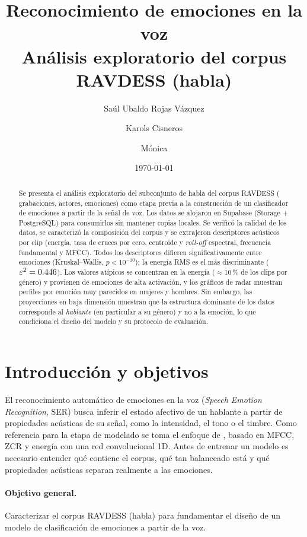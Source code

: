 \documentclass[11pt,a4paper]{article}
\title{\textbf{Reconocimiento de emociones en la voz}\\[4pt]
\large Análisis exploratorio del corpus RAVDESS (habla)}
\author{Saúl Ubaldo Rojas Vázquez \and Karols Cisneros \and Mónica}
\date{\today}
\begin{document}
\maketitle
\thispagestyle{empty}

\begin{abstract}
\noindent Se presenta el análisis exploratorio del subconjunto de habla del corpus RAVDESS
(\nClips{} grabaciones, \nActores{} actores, \nEmociones{} emociones) como etapa previa a la construcción
de un clasificador de emociones a partir de la señal de voz. Los datos se alojaron en Supabase
(Storage + PostgreSQL) para consumirlos sin mantener copias locales. Se verificó la calidad de los
datos, se caracterizó la composición del corpus y se extrajeron \nDescriptores{} descriptores acústicos por
clip (energía, tasa de cruces por cero, centroide y \emph{roll-off} espectral, frecuencia fundamental y
MFCC). Todos los descriptores difieren significativamente entre emociones (Kruskal--Wallis, $p<10^{-10}$);
la energía RMS es el más discriminante ($\varepsilon^2=0.446$). Los valores atípicos se concentran en
la energía (\(\approx\)10\,\% de los clips por género) y provienen de emociones de alta activación, y los
gráficos de radar muestran perfiles por emoción muy parecidos en mujeres y hombres. Sin embargo, las proyecciones en baja
dimensión muestran que la estructura dominante de los datos corresponde al \emph{hablante} (en particular
a su género) y no a la emoción, lo que condiciona el diseño del modelo y su protocolo de evaluación.
\end{abstract}

\section{Introducción y objetivos}

El reconocimiento automático de emociones en la voz (\emph{Speech Emotion Recognition}, SER) busca inferir
el estado afectivo de un hablante a partir de propiedades acústicas de su señal, como la intensidad, el
tono o el timbre. Como referencia para la etapa de modelado se toma el enfoque de \cite{kaggleref}, basado en
MFCC, ZCR y energía con una red convolucional 1D. Antes de entrenar un modelo es necesario entender qué contiene el corpus, qué tan
balanceado está y qué propiedades acústicas separan realmente a las emociones.

\paragraph{Objetivo general.} Caracterizar el corpus RAVDESS (habla) para fundamentar el diseño de un
modelo de clasificación de emociones a partir de la voz.
\end{document}
